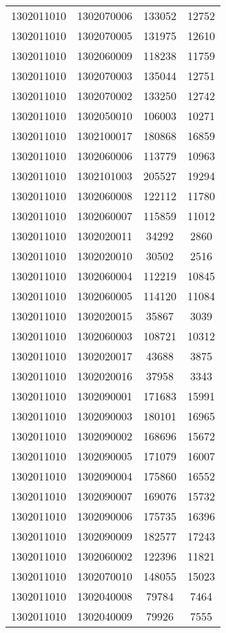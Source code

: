 \begin{longtable}[h]{llcc}
		1302011010 & 1302070006 & 133052 & 12752\\
		1302011010 & 1302070005 & 131975 & 12610\\
		1302011010 & 1302060009 & 118238 & 11759\\
		1302011010 & 1302070003 & 135044 & 12751\\
		1302011010 & 1302070002 & 133250 & 12742\\
		1302011010 & 1302050010 & 106003 & 10271\\
		1302011010 & 1302100017 & 180868 & 16859\\
		1302011010 & 1302060006 & 113779 & 10963\\
		1302011010 & 1302101003 & 205527 & 19294\\
		1302011010 & 1302060008 & 122112 & 11780\\
		1302011010 & 1302060007 & 115859 & 11012\\
		1302011010 & 1302020011 & 34292 & 2860\\
		1302011010 & 1302020010 & 30502 & 2516\\
		1302011010 & 1302060004 & 112219 & 10845\\
		1302011010 & 1302060005 & 114120 & 11084\\
		1302011010 & 1302020015 & 35867 & 3039\\
		1302011010 & 1302060003 & 108721 & 10312\\
		1302011010 & 1302020017 & 43688 & 3875\\
		1302011010 & 1302020016 & 37958 & 3343\\
		1302011010 & 1302090001 & 171683 & 15991\\
		1302011010 & 1302090003 & 180101 & 16965\\
		1302011010 & 1302090002 & 168696 & 15672\\
		1302011010 & 1302090005 & 171079 & 16007\\
		1302011010 & 1302090004 & 175860 & 16552\\
		1302011010 & 1302090007 & 169076 & 15732\\
		1302011010 & 1302090006 & 175735 & 16396\\
		1302011010 & 1302090009 & 182577 & 17243\\
		1302011010 & 1302060002 & 122396 & 11821\\
		1302011010 & 1302070010 & 148055 & 15023\\
		1302011010 & 1302040008 & 79784 & 7464\\
		1302011010 & 1302040009 & 79926 & 7555\\

\end{longtable}
